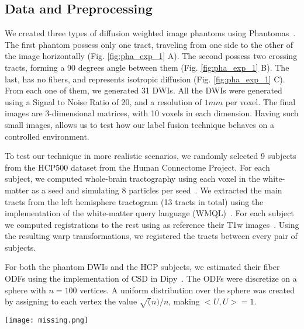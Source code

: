 \subsection{Data and Preprocessing}
We created three types of diffusion weighted image phantoms using Phantomas~\cite{Caruyer2014}.
The first phantom possess only one tract, traveling from one side to the other of the
image horizontally (Fig. \ref{fig:pha_exp_1} A). The second possess two crossing tracts,
forming a 90 degrees angle between them (Fig. \ref{fig:pha_exp_1} B). The last, has no
fibers, and represents isotropic diffusion (Fig. \ref{fig:pha_exp_1} C). From
each one of them, we generated 31 DWIs. All the DWIs were generated using a
Signal to Noise Ratio of 20, and a resolution of $1mm$ per voxel. The final
images are 3-dimensional matrices, with 10 voxels in each dimension. Having
such small images, allows us to test how our label fusion technique behaves
on a controlled environment.

To test our technique in more realistic scenarios, we randomly selected 9 subjects
from the HCP500 dataset from the Human Connectome Project. For each subject,
we computed whole-brain tractography using each voxel in the white-matter as
a seed and simulating 8 particles per seed~\cite{Garyfallidis2014}. We extracted
the main tracts from the left hemisphere tractogram (13 tracts in total) using
the implementation of the white-matter query language (WMQL)~\cite{Wassermann2016}.
For each subject we computed registrations to the rest using as reference their
T1w images~\cite{Jenkinson2012}. Using the resulting warp transformations, we
registered the tracts between every pair of subjects.

For both the phantom DWIs and the HCP subjects, we estimated their fiber ODFs
using the implementation of CSD in Dipy~\cite{Garyfallidis2014}. The ODFs were
discretize on a sphere with $n=100$ vertices. A uniform distribution over the sphere
was created by assigning to each vertex the value $\sqrt(n)/n$, making $<U, U> = 1$.

\begin{figure*}[h]
    \texttt{[image: missing.png]}
    \caption{Phantoms created to test how our technique weights the votes.
             (A) Only one tract in the white matter (B) No tracts, free diffusion.}
    \label{fig:pha_exp_1}
\end{figure*}

